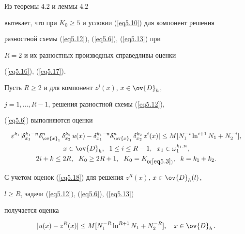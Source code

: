 \begin{notenonum}


Из теоремы 4.2 и леммы 4.2


вытекает, что при $K_0\ge 5$ и условии (\ref{eq5.10}) для компонент решения


разностной схемы  (\ref{eq5.12}), (\ref{eq5.6}), (\ref{eq5.13}) при


$R=2$ и их разностных производных справедливы оценки


(\ref{eq5.16}), (\ref{eq5.17}).


\end{notenonum}





Пусть $R\ge 2$ и для компонент $z^j(x)$, $x\in\ov{D}_h$,


$j=1,\dotsc,R-1$, решения разностной схемы (\ref{eq5.12}),


(\ref{eq5.6}) выполняются оценки


\begin{gather}


\label{eq5.18}


\eps^{k_1}|\delta_{x_1}^{k_1-n}\delta_{\ov{x}_1}^n\,\delta^{k_2}_{x_2}\,u(x)-


\delta_{x_1}^{k_1-n}\delta^n_{\ov{x}_1}\,\delta^{k_2}_{x_2}\,z^i(x)|\le


M[N_1^{-i}\ln^{i+1} N_1+N_2^{-i}], \\


x\in\ov{D}_h,\ \; 1\le i\le R-1,\ \; x_1\in \omega_1^{k_1,n}, \notag\\


2i+k\le 2R,\ \; K_0\ge 2R+1,\ \;  K_0=K_{0(\ref{eq5.3})},


\ \; k=k_1+k_2. \notag


\end{gather}





С учетом оценок (\ref{eq5.18}) для решения $z^R(x)$, $x\in\ov{D}_h(l)$,


$l\ge R$, задачи (\ref{eq5.12}), (\ref{eq5.6}), (\ref{eq5.13})


получается оценка


\begin{equation}


\label{eq5.19}


|u(x)-z^R(x)|\le M[N_1^{-R}\ln^{R+1}N_{1} + N_2^{-R}],


\quad x\in\ov{D}_h\,.


\end{equation}





